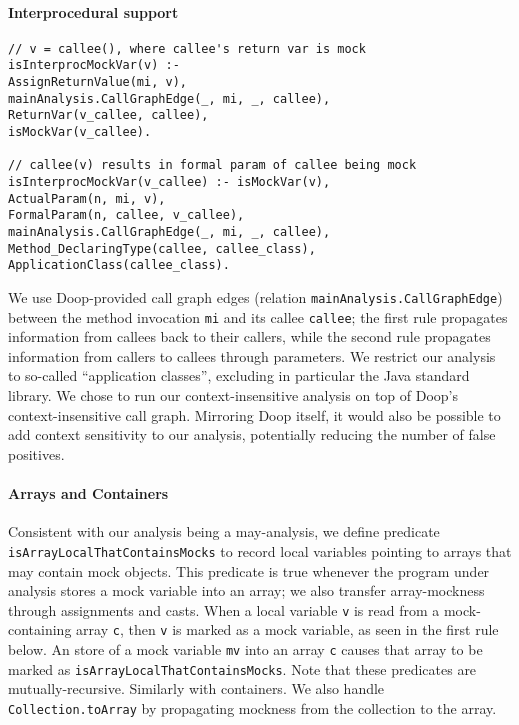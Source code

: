 \paragraph{Interprocedural support} 
\begin{lstlisting}[basicstyle=\ttfamily\small,numbers=none]
// v = callee(), where callee's return var is mock
isInterprocMockVar(v) :-
AssignReturnValue(mi, v),
mainAnalysis.CallGraphEdge(_, mi, _, callee),
ReturnVar(v_callee, callee),
isMockVar(v_callee).

// callee(v) results in formal param of callee being mock
isInterprocMockVar(v_callee) :- isMockVar(v),
ActualParam(n, mi, v),
FormalParam(n, callee, v_callee),
mainAnalysis.CallGraphEdge(_, mi, _, callee),
Method_DeclaringType(callee, callee_class),
ApplicationClass(callee_class).
\end{lstlisting}
We use Doop-provided call graph edges (relation \texttt{mainAnalysis.CallGraphEdge}) between the method invocation {\tt mi} and its callee {\tt callee}; the first rule propagates information from callees back to their callers, while the second rule propagates information from callers to callees through parameters. We restrict our analysis to so-called ``application classes'', excluding in particular the Java standard library. We chose to run our context-insensitive analysis on top of Doop's context-insensitive call graph. Mirroring Doop itself, it would also be possible to add context sensitivity to our analysis, potentially reducing the number of false positives.%

\paragraph{Arrays and Containers} Consistent with our analysis being a may-analysis, we define predicate {\tt isArrayLocalThatContainsMocks} to record local variables pointing to arrays that may contain mock objects. This predicate is true whenever the program under analysis stores a mock variable into an array; we also transfer array-mockness through assignments and casts. When a local variable \texttt{v} is read from a mock-containing array \texttt{c}, then \texttt{v} is marked as a mock variable, as seen in the first rule below. An store of a mock variable \texttt{mv} into an array \texttt{c} causes that array to be marked as \texttt{isArrayLocalThatContainsMocks}. Note that these predicates are mutually-recursive. Similarly with containers. We also handle {\tt Collection.toArray} by propagating mockness from the collection to the array.

